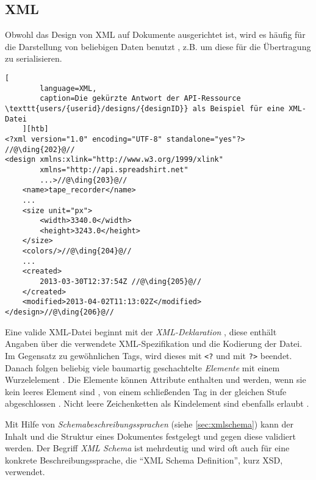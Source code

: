 \subsection{XML}
\label{sec:xml}


Obwohl das Design von XML auf Dokumente ausgerichtet ist, wird es häufig für die Darstellung von beliebigen Daten benutzt \cite{wiki:xml}, z.B. um diese für die Übertragung zu serialisieren.

\begin{lstlisting}[
        language=XML, 
        caption=Die gekürzte Antwort der API-Ressource \texttt{users/{userid}/designs/{designID}} als Beispiel für eine XML-Datei
    ][htb]
<?xml version="1.0" encoding="UTF-8" standalone="yes"?> //@\ding{202}@//
<design xmlns:xlink="http://www.w3.org/1999/xlink" 
        xmlns="http://api.spreadshirt.net" 
        ...>//@\ding{203}@//
    <name>tape_recorder</name>
    ...
    <size unit="px">
        <width>3340.0</width>
        <height>3243.0</height>
    </size>
    <colors/>//@\ding{204}@//
    ...
    <created>
        2013-03-30T12:37:54Z //@\ding{205}@//
    </created>
    <modified>2013-04-02T11:13:02Z</modified>
</design>//@\ding{206}@//
\end{lstlisting}

Eine valide XML-Datei beginnt mit der \emph{XML-Deklaration} , diese enthält Angaben über die verwendete XML-Spezifikation und die Kodierung der Datei. 
Im Gegensatz zu gewöhnlichen Tags, wird dieses mit \texttt{<?} und mit \texttt{?>} beendet. 
Danach folgen beliebig viele baumartig geschachtelte \emph{Elemente} mit einem Wurzelelement . Die Elemente können Attribute enthalten und werden, wenn sie kein leeres Element sind , von einem schließenden Tag in der gleichen Stufe abgeschlossen . Nicht leere Zeichenketten als Kindelement sind ebenfalls erlaubt .

Mit Hilfe von \emph{Schemabeschreibungssprachen} (siehe \cref{sec:xmlschema}) kann der Inhalt und die Struktur eines Dokumentes festgelegt und gegen diese validiert werden. Der Begriff \emph{XML Schema} ist mehrdeutig und wird oft auch für eine konkrete Beschreibungssprache, die \enquote{XML Schema Definition}, kurz \gls{XSD}, verwendet.
